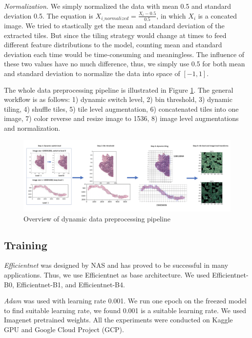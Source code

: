 \documentclass{article}
\begin{document}
\textit{Normalization.} We simply normalized the data with mean 0.5 and standard deviation 0.5. The equation is $X_{i\_normalized} = \frac{X_i - 0.5}{0.5}$, in which $X_i$ is a concated image. We tried to stastically get the mean and standard deviation of the extracted tiles. But since the tiling strategy would change at times to feed different feature distributions to the model, counting mean and standard deviation each time would be time-consuming and meaningless. The influence of these two values have no much difference, thus, we simply use 0.5 for both mean and standard deviation to normalize the data into space of $[-1, 1]$.

The whole data preprocessing pipeline is illustrated in Figure \ref{fig:pre}. The general workflow is as follows: 1) dynamic switch level, 2) bin threshold, 3) dynamic tiling, 4) shuffle tiles, 5) tile level augmentation, 6) concatenated tiles into one image, 7) color reverse and resize image to 1536, 8) image level augmentations and normalization.



\begin{figure}[!htb]
\includegraphics[width=\linewidth]{preprocess-pipeline.png}
\caption{Overview of dynamic data preprocessing pipeline}
\label{fig:pre}
\end{figure}


\subsection{Training}

\textit{Efficientnet} \citep{tan2019efficientnet} was designed by NAS \citep{liu2018darts} and has proved to be successful in many applications. Thus, we use Efficientnet as base architecture. We used Efficientnet-B0, Efficientnet-B1, and Efficientnet-B4.

\textit{Adam} \citep{kingma2014adam} was used with learning rate 0.001. We run one epoch on the freezed model to find suitable learning rate, we found 0.001 is a suitable learning rate. We used Imagenet pretrained weights. All the experiments were conducted on Kaggle GPU and Google Cloud Project (GCP). 
\end{document}
